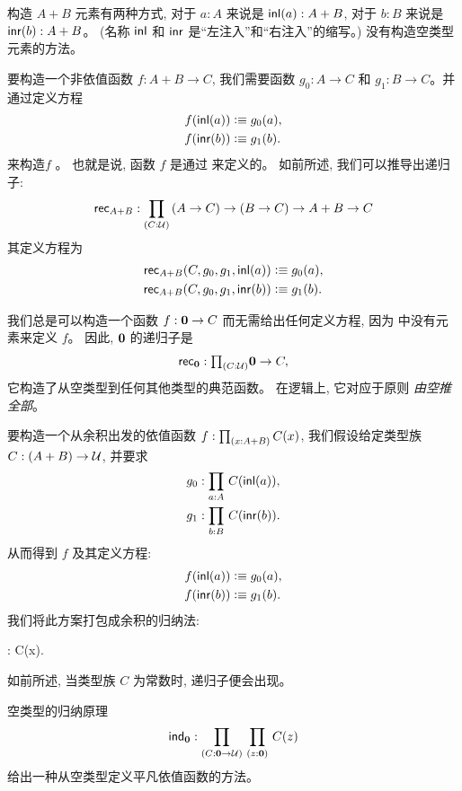 构造 $A+B$ 元素有两种方式, 对于 $a:A$ 来说是 ${\mathsf{inl}}(a) : A+B$, 对于 $b:B$ 来说是 ${\mathsf{inr}}(b):A+B$。
(名称 ${\mathsf{inl}}$ 和 ${\mathsf{inr}}$ 是``左注入''和``右注入''的缩写。)
没有构造空类型元素的方法。

要构造一个非依值函数 $f : A+B \to C$, 我们需要函数 $g_0 : A \to C$ 和 $g_1 : B \to C$。并通过定义方程
\begin{align*}
  f({\mathsf{inl}}(a)) &\vcentcolon\equiv g_0(a), \\
  f({\mathsf{inr}}(b)) &\vcentcolon\equiv g_1(b).
\end{align*}
来构造$f$ 。
也就是说, 函数 $f$ 是通过  来定义的。
%
如前所述, 我们可以推导出递归子:
%
\[ \rec{A+B} : \dprd{C:\UU}(A \to C) \to (B\to C) \to A+B \to C\]
其定义方程为
\begin{align*}
\mathsf{rec}_{A+B}(C,g_0,g_1,{\mathsf{inl}}(a)) &\vcentcolon\equiv g_0(a), \\
\mathsf{rec}_{A+B}(C,g_0,g_1,{\mathsf{inr}}(b)) &\vcentcolon\equiv g_1(b).
\end{align*}

我们总是可以构造一个函数 $f : \mathbf{0} \to C$ 而无需给出任何定义方程, 因为 \emptyt 中没有元素来定义 $f$。
因此, $\mathbf{0}$ 的递归子是
%
\[\rec{\emptyt} : \tprd{C:\UU} \emptyt \to C,\]
它构造了从空类型到任何其他类型的典范函数。
在逻辑上, 它对应于原则 \emph{由空推全部}。

要构造一个从余积出发的依值函数 $f:\prd{x:A+B}C(x)$, 我们假设给定类型族 $C: (A + B) \to \mathcal{U}$, 并要求
\begin{align*}
  g_0 &: \prd{a:A} C(\inl(a)), \\
  g_1 &: \prd{b:B} C(\inr(b)).
\end{align*}
从而得到 $f$ 及其定义方程: 
\begin{align*}
  f({\mathsf{inl}}(a)) &\vcentcolon\equiv g_0(a), \\
  f({\mathsf{inr}}(b)) &\vcentcolon\equiv g_1(b).
\end{align*}
我们将此方案打包成余积的归纳法:
%
\begin{narrowmultline*}
   :
   \to \narrowbreak
   \to {}C(x). 
\end{narrowmultline*}
如前所述, 当类型族 $C$ 为常数时, 递归子便会出现。

空类型的归纳原理
%
\[ \ind{\emptyt} : \prd{C:\emptyt \to \UU}{z:\emptyt} C(z) \]
给出一种从空类型定义平凡依值函数的方法。

